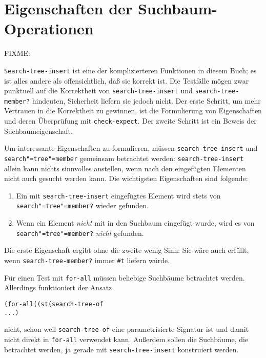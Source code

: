 
\section{Eigenschaften der Suchbaum-Operationen}

FIXME:

\texttt{Search-tree-insert} ist eine der komplizierteren Funktionen in
diesem Buch; es ist alles andere als offensichtlich, daß sie korrekt
ist.  Die Testfälle mögen zwar punktuell auf die Korrektheit von
\texttt{search-tree-insert} und \texttt{search-tree-member?}
hindeuten, Sicherheit liefern sie jedoch nicht.  Der erste Schritt, um
mehr Vertrauen in die Korrektheit zu gewinnen, ist die Formulierung
von Eigenschaften und deren Überprüfung mit \texttt{check-expect}.
Der zweite Schritt ist ein Beweis der Suchbaumeigenschaft.

Um interessante Eigenschaften zu formulieren, müssen
\texttt{search-tree-insert} und \texttt{search"=tree"=member} gemeinsam
betrachtet werden: \texttt{search-tree-insert} allein kann nichts
sinnvolles anstellen, wenn nach den eingefügten Elementen nicht auch
gesucht werden kann.  Die wichtigsten Eigenschaften sind folgende:
%
\begin{enumerate}
\item Ein mit \texttt{search-tree-insert} eingefügtes Element wird
  stets von \texttt{search"=tree"=member?} wieder gefunden.
\item Wenn ein Element \emph{nicht} mit in den Suchbaum eingefügt
  wurde, wird es von \texttt{search"=tree"=member?} \emph{nicht}
  gefunden.
\end{enumerate}
%
Die erste Eigenschaft ergibt ohne die zweite wenig Sinn: Sie wäre auch
erfüllt, wenn \texttt{search-tree-member?} immer \verb|#t| liefern
würde.

Für einen Test mit \texttt{for-all} müssen beliebige Suchbäume
betrachtet werden.  Allerdings funktioniert der Ansatz
%
\begin{alltt}
(for-all ((st (search-tree-of %a)))
  ...)
\end{alltt}
%
nicht, schon weil \texttt{search-tree-of} eine  parametrisierte Signatur ist und
damit nicht direkt in \texttt{for-all} verwendet kann.  Außerdem
sollen die Suchbäume, die betrachtet werden, ja gerade mit
\texttt{search-tree-insert} konstruiert werden.  

